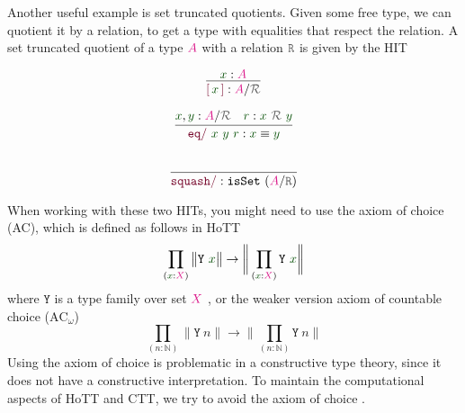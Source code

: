 \documentclass[twoside,11pt,openright]{report}
\theoremstyle{plain} %
\theoremstyle{definition}
\theoremstyle{remark}
\newcommand*{\term}[1]{\textcolor{green!30!black}{#1}} %
\newcommand*{\type}[1]{\textcolor{magenta!90!black}{#1}}
\newcommand*{\relation}[1]{\textcolor{gray!75!black}{\ensuremath{\mathtt{#1}}}}
\newcommand*{\constructor}[1]{\textcolor{purple!60!black}{\ensuremath{\mathtt{#1}}}}
\newcommand*{\typeformer}[1]{\ensuremath{\mathtt{#1}}}
\newcommand*{\quotientconstructor}[1]{\constructor{[}\,#1\,\constructor{]}}
\begin{document}
Another useful example is set truncated quotients. Given some free type, we can quotient it by a relation, to get a type with equalities that respect the relation. A set truncated quotient of a type \(\type{A}\) with a relation \(\relation{R}\) is given by the HIT  \\[-10mm]
\begin{center}
  \strut
  \hfill
  \begin{minipage}[b]{0.2\linewidth}
    \begin{equation}
      \vcenter{\infer{\quotientconstructor{\term{x}} : \type{A} / \relation{\mathcal{R}}}{\term{x} : \type{A}}}
    \end{equation}
  \end{minipage}
  \hfill
  \begin{minipage}[b]{0.325\linewidth}
    \begin{equation}
      \vcenter{\infer{\constructor{eq/}~\term{x}~\term{y}~\term{r} : \term{x} \equiv \term{y}}{\term{x}, \term{y} : \type{A} / \relation{\mathcal{R}} & \term{r} : \term{x}~\relation{\mathcal{R}}~\term{y}}}
    \end{equation}
  \end{minipage}
  \hfill
  \begin{minipage}[b]{0.325\linewidth}
    \begin{equation}
      \vcenter{\infer{\constructor{squash/} :\texttt{isSet}~(\type{A} / \relation{R})}{\strut}}
    \end{equation}
  \end{minipage}
  \hfill
  \strut
\end{center}
When working with these two HITs, you might need to use the axiom of choice (AC), which is defined as follows in HoTT
\begin{equation}
  \prod_{(\term{x} : \type{X})} \big\| \typeformer{Y}~\term{x} \big\| \rightarrow \bigg\| \prod_{(\term{x} : \type{X})} \typeformer{Y}~\term{x} \bigg\|
\end{equation}
where \(\typeformer{Y}\) is a type family over set \(\type{X}\) \cite[Section 3.8]{hottbook}, or the weaker version axiom of countable choice (\(\text{AC}_{\omega}\))
\begin{equation}
  \prod_{(n : \mathbb{N})} \big\| \typeformer{Y}~n \big\| \rightarrow \bigg\| \prod_{(n : \mathbb{N})} \typeformer{Y}~n \bigg\|  
\end{equation}
Using the axiom of choice is problematic in a constructive type theory, since it does not have a constructive interpretation. To maintain the computational aspects of HoTT and CTT, we try to avoid the axiom of choice \cite[Introduction]{hottbook}.
\end{document}
